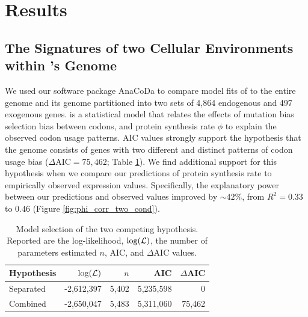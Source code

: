 \documentclass[fleqn,letterpaper]{article}
\begin{document}
\section*{Results}
\subsection*{The Signatures of two Cellular Environments within \kluyveri's Genome}
We used our software package AnaCoDa \citep{landerer2018} to compare model fits of \ROC to the entire \kluyveri genome and its genome partitioned into two sets of 4,864 endogenous and 497 exogenous genes.
\ROC is a statistical model that relates the effects of mutation bias \DM selection bias \DE between codons, and protein synthesis rate $\phi$ to explain the observed codon usage patterns.
AIC values strongly support the hypothesis that the \kluyveri genome consists of genes with two different and distinct patterns of codon usage bias ($\Delta\text{AIC} = 75,462$; Table \ref{tab:AIC_klu}).
We find additional support for this hypothesis when we compare our predictions of protein synthesis rate to empirically observed expression values.
Specifically, the explanatory power between our predictions and observed values improved by $\sim 42\%$, from $R^2 = 0.33$ to $0.46$ (Figure \ref{fig:phi_corr_two_cond}).

\begin{table}
  \centering
  \caption{Model selection of the two competing hypothesis. 
  Reported are the log-likelihood, $\log(\mathcal{L})$, the number of parameters estimated $n$, AIC, and $\Delta$AIC values.}
  \begin{tabular}{lrrrr}
    \hline
    Hypothesis             & $\log(\mathcal{L})$ &$n$ &  AIC & $\Delta$AIC\\ \hline 
    Separated		   & -2,612,397 & 5,402 & 5,235,598&      0\\
    Combined               & -2,650,047 & 5,483 & 5,311,060& 75,462\\ \hline
  \end{tabular}
  \label{tab:AIC_klu}
\end{table}
\end{document}
